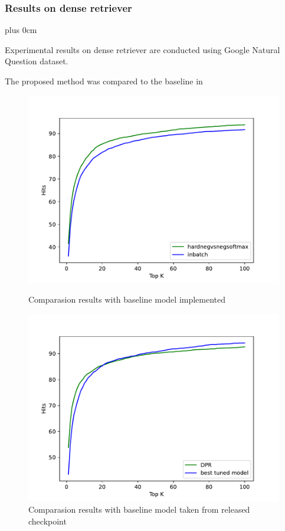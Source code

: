 \documentclass[11pt]{beamer}
\renewcommand{\raggedright}{\leftskip=0pt \rightskip=0pt plus 0cm}
\let\olditemize=\itemize
\renewenvironment{itemize}{\olditemize\raggedright}{\endlist}
\begin{document}
\begin{frame}
	\frametitle{Results on dense retriever}
	\begin{adjustwidth}{-2em}{0em}
		\begin{itemize}
			\item Experimental results on dense retriever are conducted using Google Natural Question dataset.
			\item The proposed method was compared to the baseline in \cite{dpr}
		\end{itemize}
		\begin{figure}
			\begin{minipage}{.45\linewidth}
				\includegraphics[scale=.32]{images/PDF/experiments/inbatch_hardnegvsnegsoftmax_4-1-5.pdf}
				\caption{\fontsize{8pt}{\baselineskip}\selectfont Comparasion results with baseline model implemented}
			\end{minipage}
			\hfill
			\begin{minipage}{.45\linewidth}
				\raggedleft
				\includegraphics[scale=.32]{images/PDF/experiments/benchmark_compare.pdf}
				\caption{\fontsize{8pt}{\baselineskip}\selectfont Comparasion results with baseline model taken from released checkpoint}	
			\end{minipage}
		\end{figure}
	\end{adjustwidth}
\end{frame}
\end{document}
